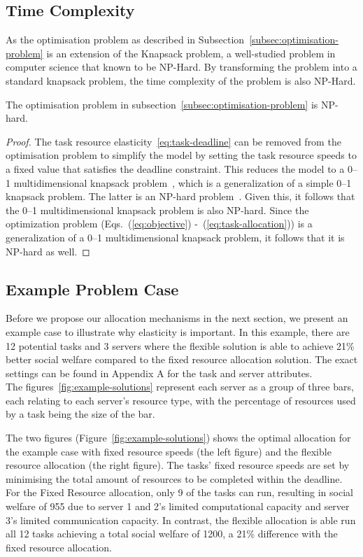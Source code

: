 \subsection{Time Complexity}
\label{subsec:time-complexity}
As the optimisation problem as described in Subsection~\ref{subsec:optimisation-problem} is an extension of the
Knapsack problem, a well-studied problem in computer science that known to be NP-Hard. By transforming the problem into
a standard knapsack problem, the time complexity of the problem is also NP-Hard.
\begin{theorem}
    The optimisation problem in subsection~\ref{subsec:optimisation-problem} is NP-hard.
\end{theorem}
\begin{proof}
    The task resource elasticity~\ref{eq:task-deadline} can be removed from the optimisation problem to simplify the model
    by setting the task resource speeds to a fixed value that satisfies the deadline constraint. This reduces the model
    to a 0--1 multidimensional knapsack problem~\cite{knapsackproblems_2004}, which is a generalization of a
    simple 0--1 knapsack problem. The latter is an NP-hard problem~\cite{knapsackproblems_2004}. Given this, it follows
    that the 0--1 multidimensional knapsack problem is also NP-hard. Since the optimization problem
    (Eqs.~(\ref{eq:objective}) -~(\ref{eq:task-allocation})) is a generalization of a 0--1 multidimensional knapsack
    problem, it follows that it is NP-hard as well.
\end{proof}

\subsection{Example Problem Case}
\label{subsec:example-problem-case}
Before we propose our allocation mechanisms in the next section, we present an example case to illustrate
why elasticity is important. In this example, there are 12 potential tasks and 3 servers where the flexible solution
is able to achieve 21\% better social welfare compared to the fixed resource allocation solution.
The exact settings can be found in Appendix A for the task and server attributes. \\
The figures~\ref{fig:example-solutions} represent each server as a
group of three bars, each relating to each server's resource type, with the percentage of resources used by a task
being the size of the bar.

The two figures (Figure~\ref{fig:example-solutions}) shows the optimal allocation for the example
case with fixed resource speeds (the left figure) and the flexible resource allocation
(the right figure). The tasks' fixed resource speeds are set by minimising the total
amount of resources to be completed within the deadline. For the Fixed Resource allocation,
only 9 of the tasks can run, resulting in social welfare of 955 due to server 1 and 2's
limited computational capacity and server 3's limited communication capacity.
In contrast, the flexible allocation is able run all 12 tasks achieving a total social welfare of 1200, a 21\% difference with the fixed resource allocation.

